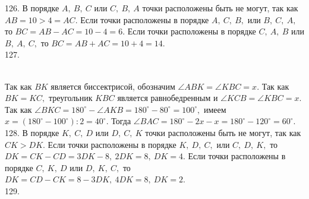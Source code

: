 \documentclass[12pt]{article}
\begin{document}
126. В порядке $A,\ B,\ C$ или $C,\ B,\ A$ точки расположены быть не могут, так как $AB=10>4=AC.$ Если точки расположены в порядке $A,\ C,\ B,$ или $B,\ C,\ A,$ то $BC=AB-AC=10-4=6.$ Если точки расположены в порядке $C,\ A,\ B$ или $B,\ A,\ C,$ то $BC=AB+AC=10+4=14.$\\
127. \begin{figure}[ht!]
\end{figure}\\
Так как $BK$ является биссектрисой, обозначим $\angle ABK=\angle KBC=x.$ Так как $BK=KC,$ треугольник $KBC$ является равнобедренным и $\angle KCB=\angle KBC=x.$ Так как $\angle BKC=180^\circ-\angle AKB=180^\circ-80^\circ=100^\circ,$ имеем $x=(180^\circ-100^\circ):2=40^\circ.$ Тогда $\angle BAC=180^\circ-2x-x=180^\circ-120^\circ=60^\circ.$\\
128. В порядке $K,\ C,\ D$ или $D,\ C,\ K$ точки расположены быть не могут, так как $CK>DK.$ Если точки расположены в порядке $K,\ D,\ C,$ или $C,\ D,\ K,$ то $DK=CK-CD=3DK-8,\ 2DK=8,\ DK=4.$ Если точки расположены в порядке $C,\ K,\ D$ или $D,\ K,\ C,$ то $DK=CD-CK=8-3DK,\ 4DK=8,\ DK=2.$\\
129. \begin{figure}[ht!]
\end{figure}\\
\end{document}
